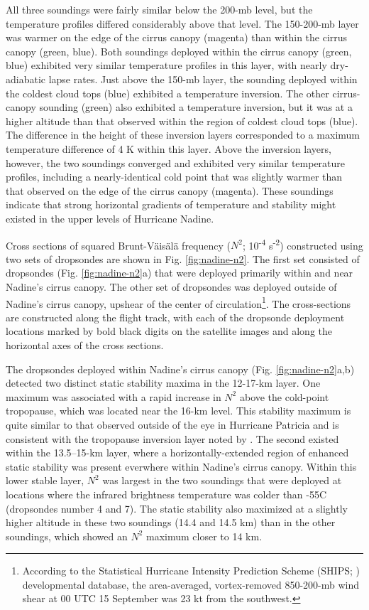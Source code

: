 All three soundings were fairly similar below the 200-mb level, but the temperature profiles differed considerably above that level.
The 150-200-mb layer was warmer on the edge of the cirrus canopy (magenta) than within the cirrus canopy (green, blue).
Both soundings deployed within the cirrus canopy (green, blue) exhibited very similar temperature profiles in this layer, with nearly dry-adiabatic lapse rates.
Just above the 150-mb layer, the sounding deployed within the coldest cloud tops (blue) exhibited a temperature inversion.
The other cirrus-canopy sounding (green) also exhibited a temperature inversion, but it was at a higher altitude than that observed within the region of coldest cloud tops (blue).
The difference in the height of these inversion layers corresponded to a maximum temperature difference of 4 K within this layer.
Above the inversion layers, however, the two soundings converged and exhibited very similar temperature profiles, including a nearly-identical cold point that was slightly warmer than that observed on the edge of the cirrus canopy (magenta).
These soundings indicate that strong horizontal gradients of temperature and stability might existed in the upper levels of Hurricane Nadine.

Cross sections of squared Brunt-V{\"a}is{\"a}l{\"a} frequency ($N^2$; 10\textsuperscript{-4} s\textsuperscript{-2}) constructed using two sets of dropsondes are shown in Fig. \ref{fig:nadine-n2}.
The first set consisted of dropsondes (Fig. \ref{fig:nadine-n2}a) that were deployed primarily within and near Nadine's cirrus canopy.
The other set of dropsondes was deployed outside of Nadine's cirrus canopy, upshear of the center of circulation\footnote{According to the Statistical Hurricane Intensity Prediction Scheme (SHIPS; \citeauthor{DeMariaetal2005} \citeyear{DeMariaetal2005}) developmental database, the area-averaged, vortex-removed 850-200-mb wind shear at 00 UTC 15 September was 23 kt from the southwest.}.
The cross-sections are constructed along the flight track, with each of the dropsonde deployment locations marked by bold black digits on the satellite images and along the horizontal axes of the cross sections.

The dropsondes deployed within Nadine's cirrus canopy (Fig. \ref{fig:nadine-n2}a,b) detected two distinct static stability maxima in the 12-17-km layer.
One maximum was associated with a rapid increase in $N^2$ above the cold-point tropopause, which was located near the 16-km level.
This stability maximum is quite similar to that observed outside of the eye in Hurricane Patricia \citep{DuranMolinari2018} and is consistent with the tropopause inversion layer noted by \cite{Wirth2003}.
The second existed within the 13.5--15-km layer, where a horizontally-extended region of enhanced static stability was present everwhere within Nadine's cirrus canopy.
Within this lower stable layer, $N^2$ was largest in the two soundings that were deployed at locations where the infrared brightness temperature was colder than -55\textdegree{}C (dropsondes number 4 and 7).
The static stability also maximized at a slightly higher altitude in these two soundings (14.4 and 14.5 km) than in the other soundings, which showed an $N^2$ maximum closer to 14 km.

